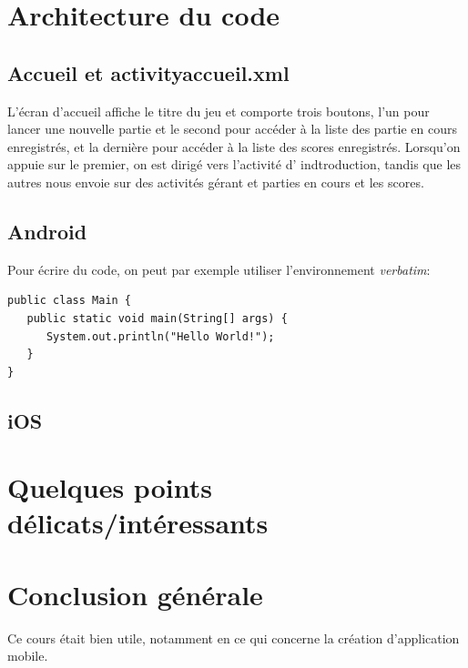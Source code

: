 \documentclass{article}
\begin{document}
\section{Architecture du code}
\subsection{Accueil et activityaccueil.xml}
L’écran d’accueil affiche le titre du jeu et comporte trois boutons, l’un pour lancer une nouvelle
partie et le second pour accéder à la liste des partie en cours  enregistrés, et la dernière pour accéder à la liste des scores enregistrés. Lorsqu’on appuie sur le premier, on est dirigé vers l’activité d' indtroduction, tandis que les autres nous envoie sur des activités
gérant et parties en cours et les scores.

\subsection{Android} %
Pour écrire du code, on peut par exemple utiliser l'environnement
\textit{verbatim}:
\begin{verbatim}
public class Main {
   public static void main(String[] args) {
      System.out.println("Hello World!");
   }
}
\end{verbatim}

\subsection{iOS} %


\section{Quelques points délicats/intéressants}


\section{Conclusion générale}
	Ce cours était bien utile, notamment en ce qui concerne la création d'application mobile.




\end{document}
